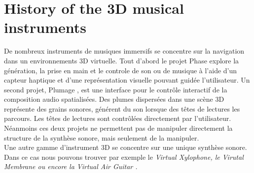 \section{History of the 3D musical instruments}
De nombreux instruments de musiques immersifs se concentre sur la navigation dans un environnements 3D virtuelle.
Tout d'abord le projet Phase \cite{rodet2005study} explore la génération, la prise en main et le controle de son ou de musique à l'aide d'un capteur haptique et d'une représentation visuelle pouvant guidée l'utilisateur.
Un second projet, Plumage \cite{plumage2007}, est une interface pour le contrôle interactif de la composition audio spatialisées. Des plumes dispersées dans une scène 3D représente des grains sonores, générent du son lorsque des têtes de lectures les parcours. Les têtes de lectures sont contrôlées directement par l'utilisateur.
Néanmoins ces deux projets ne permettent pas de manipuler directement la structure de la synthèse sonore, mais seulement de la manipuler.
\\
Une autre gamme d'instrument 3D se concentre sur une unique synthèse sonore. Dans ce cas nous pouvons trouver par exemple le \it{Virtual Xylophone}, le \it{Virutal Membrane} ou encore la \it{Virtual Air Guitar} \cite{maki2005}.